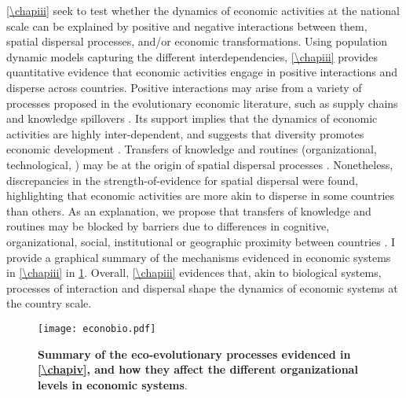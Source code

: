 \cref{\chapiii} seek to test whether the dynamics of economic activities at the national scale can be explained by positive and negative interactions between them, spatial dispersal processes, and/or economic transformations.
% 
% 
Using population dynamic models capturing the different interdependencies, \cref{\chapiii} provides quantitative evidence that economic activities engage in positive interactions and disperse across countries.
% 
Positive interactions may arise from a variety of processes proposed in the evolutionary economic literature, such as supply chains \citep{Ozman2009,Saavedra2009a} and knowledge spillovers \citep{Menon2015}. 
% 
Its support implies that the dynamics of economic activities are highly inter-dependent, and suggests that diversity promotes economic development \citep{Hidalgo2018}.
% 
Transfers of knowledge and routines (organizational, technological, \cite{XXX}) may be at the origin of spatial dispersal processes \citep{Zahra2000,Zahra2000,RogersEverettM2003DoI,Boschma2008}. Nonetheless, discrepancies in the strength-of-evidence for spatial dispersal were found, highlighting that economic activities are more akin to disperse in some countries than others. As an explanation, we propose that transfers of knowledge and routines may be blocked by barriers due to differences in cognitive, organizational, social, institutional or geographic proximity between countries \citep{Boschma2005}.
% 
I provide a graphical summary of the mechanisms evidenced in economic systems in \cref{\chapiii} in \cref{fig:summary_econobio}. Overall, \cref{\chapiii} evidences that, akin to biological systems, processes of interaction and dispersal shape the dynamics of economic systems at the country scale.

\begin{figure}[t]
    \centering
    \texttt{[image: econobio.pdf]}
    \caption{\textbf{Summary of the eco-evolutionary processes evidenced in \cref{\chapiv}, and how they affect the different organizational levels in economic systems}.}
    \label{fig:summary_econobio}
\end{figure}

% 

